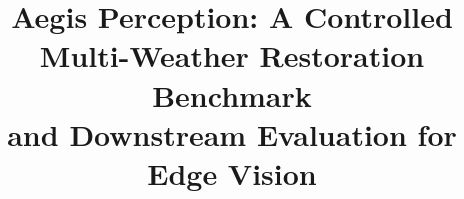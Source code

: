 \title{Aegis Perception: A Controlled Multi-Weather Restoration Benchmark\\and Downstream Evaluation for Edge Vision}
